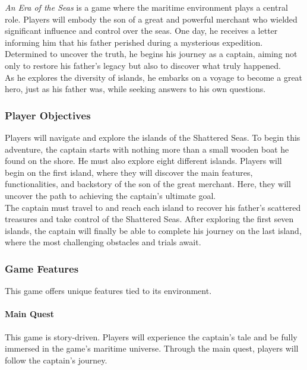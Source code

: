 \documentclass{article}
\begin{document}
\textit{An Era of the Seas} is a game where the maritime environment plays a central role. Players will embody the son of a great and powerful merchant who wielded significant influence and control over the seas. One day, he receives a letter informing him that his father perished during a mysterious expedition. Determined to uncover the truth, he begins his journey as a captain, aiming not only to restore his father's legacy but also to discover what truly happened.\\

As he explores the diversity of islands, he embarks on a voyage to become a great hero, just as his father was, while seeking answers to his own questions.



\subsubsection{Player Objectives}\hfill

Players will navigate and explore the islands of the Shattered Seas. To begin this adventure, the captain starts with nothing more than a small wooden boat he found on the shore. He must also explore eight different islands. Players will begin on the first island, where they will discover the main features, functionalities, and backstory of the son of the great merchant. Here, they will uncover the path to achieving the captain's ultimate goal.\\

The captain must travel to and reach each island to recover his father's scattered treasures and take control of the Shattered Seas. After exploring the first seven islands, the captain will finally be able to complete his journey on the last island, where the most challenging obstacles and trials await.



\subsubsection{Game Features}\hfill

This game offers unique features tied to its environment.

\paragraph{Main Quest}\hfill

This game is story-driven. Players will experience the captain's tale and be fully immersed in the game's maritime universe. Through the main quest, players will follow the captain's journey.
\end{document}
